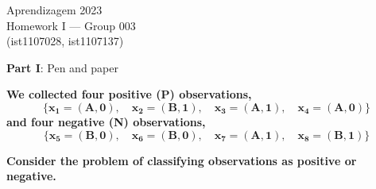 \documentclass[12pt]{article}
\begin{document}
\begin{center}
Aprendizagem 2023\\
Homework I --- Group 003\\
(ist1107028, ist1107137)\vskip 1cm
\end{center}

\large{\textbf{Part I}: Pen and paper}\normalsize

\vspace{20pt}
\hspace{-20pt}\textbf{We collected four positive (P) observations,}
\[
\boldsymbol{\{x_1 = (A,0), \quad x_2 = (B,1), \quad x_3 = (A,1), \quad x_4 = (A,0)\}}
\]
\textbf{and four negative (N) observations,}
\[
\boldsymbol{\{x_5 = (B,0), \quad x_6 = (B,0), \quad x_7 = (A,1), \quad x_8 = (B,1)\}}
\]


\hspace{-20pt}\textbf{Consider the problem of classifying observations as positive or negative.}
\end{document}
